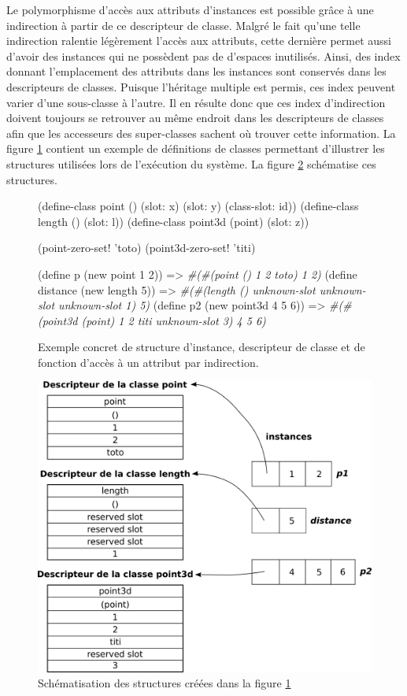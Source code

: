 \documentclass[12pt,oneside,letterpaper,francais]{book}
\newcommand{\schemeresult}[1]{{\it #1}}
\begin{document}
Le polymorphisme d'accès aux attributs d'instances est possible grâce
à une indirection à partir de ce descripteur de classe. Malgré le fait
qu'une telle indirection ralentie légèrement l'accès aux attributs,
cette dernière permet aussi d'avoir des instances qui ne possèdent pas
de d'espaces inutilisés. Ainsi, des index donnant l'emplacement des
attributs dans les instances sont conservés dans les descripteurs de
classes. Puisque l'héritage multiple est permis, ces index peuvent
varier d'une sous-classe à l'autre. Il en résulte donc que ces index
d'indirection doivent toujours se retrouver au même endroit dans les
descripteurs de classes afin que les accesseurs des super-classes
sachent où trouver cette information. La figure \ref{OO:obj-struct}
contient un exemple de définitions de classes permettant d'illustrer
les structures utilisées lors de l'exécution du système. La figure
\ref{OO:classdesc} schématise ces structures.

\begin{figure}[htb!]
  \begin{schemecode}
(define-class point () (slot: x) (slot: y) (class-slot: id))
(define-class length () (slot: l))
(define-class point3d (point) (slot: z))

(point-zero-set! 'toto)
(point3d-zero-set! 'titi)

(define p (new point 1 2))
   => \schemeresult{\#(\#(point () 1 2 toto) 1 2)}
(define distance (new length 5)) 
   => \schemeresult{\#(\#(length () unknown-slot unknown-slot unknown-slot 1) 5)}
(define p2 (new point3d 4 5 6))  
   => \schemeresult{\#(\#(point3d (point) 1 2 titi unknown-slot 3) 4 5 6)}
  \end{schemecode}
  \caption{Exemple concret de structure d'instance, descripteur de
    classe et de fonction d'accès à un attribut par indirection.}
  \label{OO:obj-struct}
\end{figure}


\begin{figure}[htb!]
  \center
  \includegraphics[scale=0.7]{oo-schema}
  \caption{Schématisation des structures créées dans la figure
    \ref{OO:obj-struct}}
  \label{OO:classdesc}
\end{figure}
\end{document}
